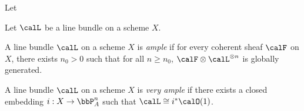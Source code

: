     \begin{example}\label{eg:multiple_of_globally_generated_line_bundle_is_globally_generated}
        Let 
    \end{example}

    \begin{example}\label{eg:product_of_pullback_along_natural_projection_is_globally_generated}
        
    \end{example}

    \begin{definition}\label{def:base_locus_and_base_idea}
        Let \(\calL\) be a line bundle on a scheme \(X\).
    \end{definition}


    \begin{definition}\label{def:ample_line_bundle}
        A line bundle \(\calL\) on a scheme \(X\) is \emph{ample} if for every coherent sheaf \(\calF\) on \(X\), there exists \(n_0>0\) such that for all \(n\ge n_0\), \(\calF\otimes \calL^{\otimes n}\) is globally generated.
    \end{definition}

    \begin{definition}\label{def:very_ample_line_bundle}
        A line bundle \(\calL\) on a scheme \(X\) is \emph{very ample} if there exists a closed embedding \(i:X\to \bbP^n_A\) such that \(\calL\cong i^*\calO(1)\).
    \end{definition}





